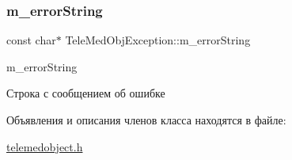 \subsubsection{\texorpdfstring{m\+\_\+error\+String}{m\_errorString}}
{\footnotesize\ttfamily const char$\ast$ Tele\+Med\+Obj\+Exception\+::m\+\_\+error\+String\hspace{0.3cm}{\ttfamily [private]}}



m\+\_\+error\+String 

Строка с сообщением об ошибке 

Объявления и описания членов класса находятся в файле\+:\begin{DoxyCompactItemize}
\item 
\hyperlink{telemedobject_8h}{telemedobject.\+h}\end{DoxyCompactItemize}
